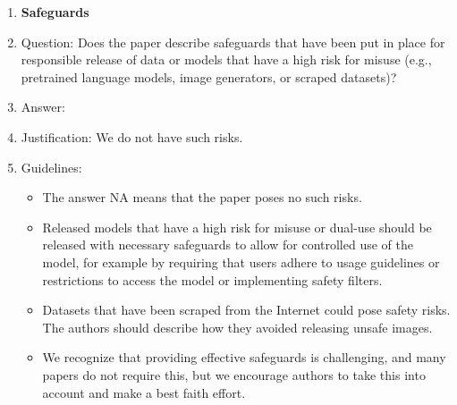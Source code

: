 \documentclass{article}
\begin{document}
\begin{enumerate}
\item {\bf Safeguards}
    \item[] Question: Does the paper describe safeguards that have been put in place for responsible release of data or models that have a high risk for misuse (e.g., pretrained language models, image generators, or scraped datasets)?
    \item[] Answer: \answerNA{} %
    \item[] Justification: We do not have such risks.
    \item[] Guidelines:
    \begin{itemize}
        \item The answer NA means that the paper poses no such risks.
        \item Released models that have a high risk for misuse or dual-use should be released with necessary safeguards to allow for controlled use of the model, for example by requiring that users adhere to usage guidelines or restrictions to access the model or implementing safety filters. 
        \item Datasets that have been scraped from the Internet could pose safety risks. The authors should describe how they avoided releasing unsafe images.
        \item We recognize that providing effective safeguards is challenging, and many papers do not require this, but we encourage authors to take this into account and make a best faith effort.
    \end{itemize}


\end{enumerate}
\end{document}
